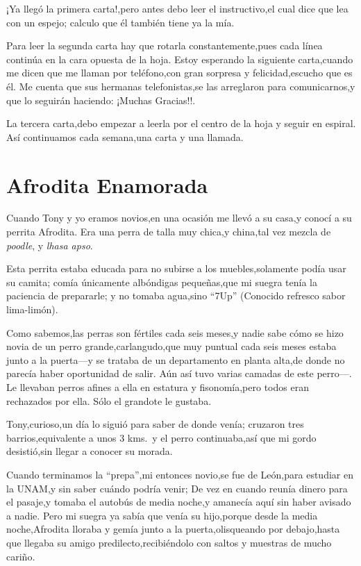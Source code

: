 \documentclass[letterpaper,12pt]{book}
\begin{document}
¡Ya llegó la primera carta!,pero antes debo leer el instructivo,el cual dice que lea con un espejo; calculo que él también tiene ya la mía. 

Para leer la segunda carta hay que rotarla constantemente,pues cada línea continúa en la cara opuesta de la hoja. Estoy esperando la siguiente carta,cuando me dicen que me llaman por teléfono,con gran sorpresa y felicidad,escucho que es él. Me cuenta que sus hermanas telefonistas,se las arreglaron para comunicarnos,y que lo seguirán haciendo: ¡Muchas Gracias!!.

La tercera carta,debo empezar a leerla por el centro de la hoja y seguir en espiral. Así continuamos cada semana,una carta y una llamada. 

\chapter{Afrodita Enamorada}
Cuando Tony y yo eramos novios,en una ocasión me llevó a su casa,y conocí a su perrita Afrodita. Era una perra de talla muy chica,y china,tal vez mezcla de \textit{poodle}, y \textit{lhasa apso}. 

Esta perrita estaba educada para no subirse a los muebles,solamente podía usar su camita; comía únicamente albóndigas pequeñas,que mi suegra tenía la paciencia de prepararle; y no tomaba agua,sino ``7Up'' (Conocido refresco sabor lima-limón).

Como sabemos,las perras son fértiles cada seis meses,y nadie sabe cómo se hizo novia de un perro grande,carlangudo,que muy puntual cada seis meses estaba junto a la puerta---y se trataba de un departamento en planta alta,de donde no parecía haber oportunidad de salir. Aún así tuvo varias camadas de este perro---. Le llevaban perros afines a ella en estatura y fisonomía,pero todos eran rechazados por ella. Sólo el grandote le gustaba.

Tony,curioso,un día lo siguió para saber de donde venía; cruzaron tres barrios,equivalente a unos 3 kms.\ y el perro continuaba,así que mi gordo desistió,sin llegar a conocer su morada.

Cuando terminamos la ``prepa'',mi entonces novio,se fue de León,para estudiar en la UNAM,y sin saber cuándo podría venir; De vez en cuando reunía dinero para el pasaje,y tomaba el autobús de media noche,y amanecía aquí sin haber avisado a nadie. Pero mi suegra ya sabía que venía su hijo,porque desde la media noche,Afrodita lloraba y gemía junto a la puerta,olisqueando por debajo,hasta que llegaba su amigo predilecto,recibiéndolo con saltos y muestras de mucho cariño.
\end{document}
